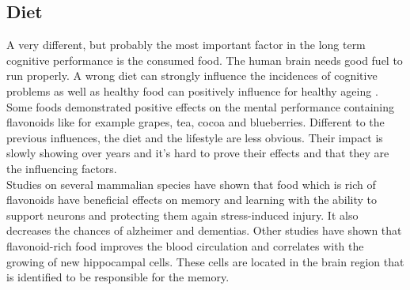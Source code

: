 \subsection{Diet}
A very different, but probably the most important factor in the long term cognitive performance is the consumed food. The human brain needs good fuel to run properly. A wrong diet can strongly influence the incidences of cognitive problems as well as healthy food can positively influence for healthy ageing \cite{spencer2008food}.\\
Some foods demonstrated positive effects on the mental performance containing flavonoids like for example grapes, tea, cocoa and blueberries. 
Different to the previous influences, the diet and the lifestyle are less obvious. Their impact is slowly showing over years and it's hard to prove their effects and that they are the influencing factors.\\
Studies on several mammalian species have shown that food which is rich of flavonoids have beneficial effects on memory and learning with the ability to support neurons and protecting them again stress-induced injury.
It also decreases the chances of alzheimer and dementias. Other studies have shown that flavonoid-rich food improves the blood circulation and correlates with the growing of new hippocampal cells. These cells are located in the brain region that is identified to be responsible for the memory.